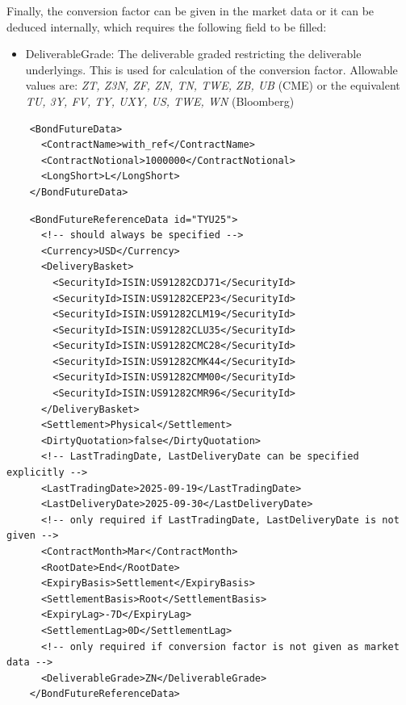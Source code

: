 Finally, the conversion factor can be given in the market data or it can be deduced internally, which requires the following field to be filled:

\begin{itemize}
  \item DeliverableGrade: The deliverable graded restricting the deliverable underlyings. This is used for calculation of the conversion factor.
  Allowable values are: \emph{ZT, Z3N, ZF, ZN, TN, TWE, ZB, UB} (CME) or the equivalent \emph{TU, 3Y, FV, TY, UXY, US, TWE, WN} (Bloomberg)
\end{itemize}

\begin{listing}[H]
  \begin{verbatim}
    <BondFutureData>
      <ContractName>with_ref</ContractName>
      <ContractNotional>1000000</ContractNotional>
      <LongShort>L</LongShort>
    </BondFutureData>
  \end{verbatim}
  \caption{BondFutureData}
  \label{lst:bondfuturetradedata}
\end{listing}


\begin{listing}[H]
  \begin{verbatim}
    <BondFutureReferenceData id="TYU25">
      <!-- should always be specified -->
      <Currency>USD</Currency>
      <DeliveryBasket>
        <SecurityId>ISIN:US91282CDJ71</SecurityId>
        <SecurityId>ISIN:US91282CEP23</SecurityId>
        <SecurityId>ISIN:US91282CLM19</SecurityId>
        <SecurityId>ISIN:US91282CLU35</SecurityId>
        <SecurityId>ISIN:US91282CMC28</SecurityId>
        <SecurityId>ISIN:US91282CMK44</SecurityId>
        <SecurityId>ISIN:US91282CMM00</SecurityId>
        <SecurityId>ISIN:US91282CMR96</SecurityId>
      </DeliveryBasket>
      <Settlement>Physical</Settlement>
      <DirtyQuotation>false</DirtyQuotation>
      <!-- LastTradingDate, LastDeliveryDate can be specified explicitly -->
      <LastTradingDate>2025-09-19</LastTradingDate>
      <LastDeliveryDate>2025-09-30</LastDeliveryDate>
      <!-- only required if LastTradingDate, LastDeliveryDate is not given -->
      <ContractMonth>Mar</ContractMonth>
      <RootDate>End</RootDate>
      <ExpiryBasis>Settlement</ExpiryBasis>
      <SettlementBasis>Root</SettlementBasis>
      <ExpiryLag>-7D</ExpiryLag>
      <SettlementLag>0D</SettlementLag>
      <!-- only required if conversion factor is not given as market data -->
      <DeliverableGrade>ZN</DeliverableGrade>
    </BondFutureReferenceData>
  \end{verbatim}
  \caption{BondFutureReferenceData}
  \label{lst:bondfuturerefdata}
\end{listing}

